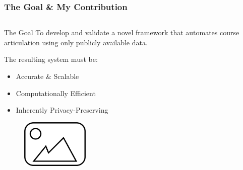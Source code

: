 \documentclass[aspectratio=169,10pt]{beamer}
\begin{document}
\begin{frame}
    \frametitle{The Goal \& My Contribution}
    \vspace{-0.5em}
    \begin{columns}[T]
        \begin{column}{0.47\textwidth}
            \begin{block}{The Goal}
                To develop and validate a novel framework that automates course articulation using only publicly available data.
                
                \vspace{0.5em}
                The resulting system must be:
                \begin{itemize}
                    \item<2-> Accurate \& Scalable
                    \item<3-> Computationally Efficient
                    \item<4-> Inherently Privacy-Preserving
                \end{itemize}
            \end{block}

            \begin{figure}
                \centering
                \includegraphics[height=2.3cm]{placeholder.png} %
            \end{figure}

        \end{column}
        

\end{columns}
\end{frame}
\end{document}
